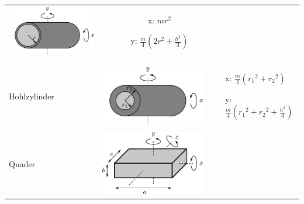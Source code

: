 \begin{table}[h!]
\begin{tabular}{m{2cm} c m{}}
\begin{minipage}{0.3\textwidth}
	\centering
	\includegraphics[scale=\traegscale]{../fig/traeg-hohlzylinder-duenn.pdf}
	\end{minipage} &
		\begin{itemize}
		\item[x:] $mr^2$
		\item[y:] $\frac{m}{4} (2r^2 + \frac{h^2}{3})$
		\end{itemize} \\
& & \\
Hohlzylinder &
	\begin{minipage}{0.3\textwidth}
	\centering
	\includegraphics[scale=\traegscale]{../fig/traeg-hohlzylinder.pdf}
	\end{minipage} &
		\begin{itemize}
		\item[x:] $\frac{m}{2} \left({r_1}^2 + {r_2}^2 \right)$
		\item[y:] $\frac{m}{4} \left({r_1}^2 + {r_2}^2 
			+ \frac{h^2}{3} \right)$
		\end{itemize}\\
Quader &
	\begin{minipage}{0.3\textwidth}
	\centering
	\includegraphics[scale=\traegscale]{../fig/traeg-quader.pdf}

\end{minipage}
\end{tabular}
\end{table}
